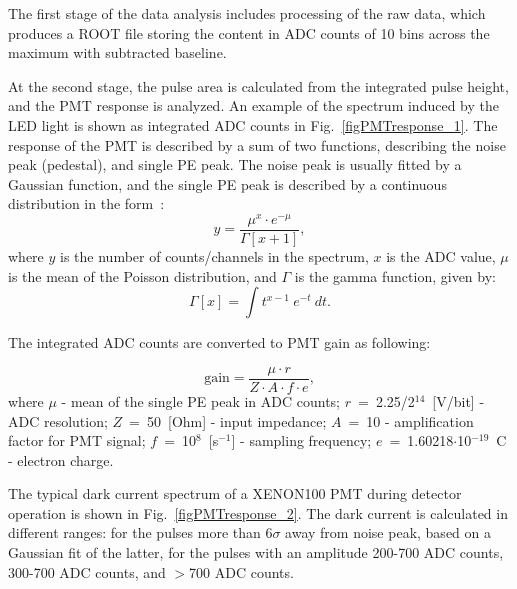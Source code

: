 
The first stage of the data analysis includes processing of the raw data, which produces a ROOT file storing the content in ADC counts of 10 bins across the maximum with subtracted baseline.

At the second stage, the pulse area is calculated from the integrated pulse height, and the PMT response is analyzed. An example of the spectrum induced by the LED light is shown as integrated ADC counts in Fig.~\ref{figPMTresponse_1}. The response of the PMT is described by a sum of two functions, describing the noise peak (pedestal), and single PE peak. The noise peak is usually fitted by a Gaussian function, and the single PE peak is described by a continuous distribution in the form~\cite{SPEfit1, SPEfit2}:
\begin{equation}
\label{ContinuousDistribution}
y = \frac{\mu^x \cdot e^{-\mu}}{\Gamma[x+1]},
\end{equation}
where $y$ is the number of counts/channels in the spectrum, $x$ is the ADC value, $\mu$ is the mean of the Poisson distribution, and $\Gamma$ is the gamma function, given by:
\begin{equation}
\label{GammaFunction}
\Gamma[x] = \int t^{x-1}\ e^{-t}\ dt.
\end{equation}

The integrated ADC counts are converted to PMT gain as following:

\begin{equation}
\mathrm{gain} = \frac{\mu \cdot r}{Z \cdot A \cdot f \cdot e},
\end{equation}
where $\mu$ - mean of the single PE peak in ADC counts;
$r$~=~2.25/2$^{14}$~[V/bit] - ADC resolution;
$Z$~=~50~[Ohm] - input impedance; 
$A$~=~10 - amplification factor for PMT signal; 
$f$~=~10$^{8}$~[s$^{-1}$] - sampling frequency; 
$e$~=~1.60218$\cdot$10$^{-19}$~C - electron charge.

The typical dark current spectrum of a XENON100 PMT during detector operation is shown in Fig.~\ref{figPMTresponse_2}. The dark current is calculated in different ranges: for the pulses more than 6$\sigma$ away from noise peak, based on a Gaussian fit of the latter, for the pulses with an amplitude 200-700 ADC counts, 300-700 ADC counts, and $>$700 ADC counts.

